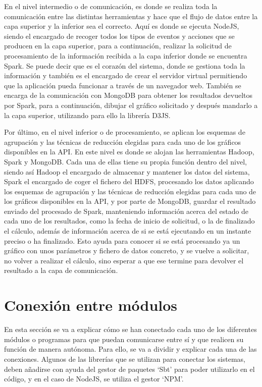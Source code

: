 En el nivel intermedio o de comunicación, es donde se realiza toda la comunicación entre las distintas herramientas y hace que el flujo de datos entre la capa superior y la inferior sea el correcto. Aquí es donde se ejecuta NodeJS, siendo el encargado de recoger todos los tipos de eventos y acciones que se producen en la capa superior, para a continuación, realizar la solicitud de procesamiento de la información recibida a la capa inferior donde se encuentra Spark. Se puede decir que es el corazón del sistema, donde se gestiona toda la información y también es el encargado de crear el servidor virtual permitiendo que la aplicación pueda funcionar a través de un navegador web. 
También se encarga de la comunicación con MongoDB para obtener los resultados devueltos por Spark, para a continuación, dibujar el gráfico solicitado y después mandarlo a la capa superior, utilizando para ello la librería D3JS. 

Por último, en el nivel inferior o de procesamiento, se aplican los esquemas de agrupación y las técnicas de reducción elegidas para cada uno de los gráficos disponibles en la API. En este nivel es donde se alojan las herramientas Hadoop, Spark y MongoDB. Cada una de ellas tiene su propia función dentro del nivel, siendo así Hadoop el encargado de almacenar y mantener los datos del sistema, Spark el encargado de coger el fichero del HDFS, procesando los datos aplicando los esquemas de agrupación y las técnicas de reducción elegidas para cada uno de los gráficos disponibles en la API, y por parte de MongoDB, guardar el resultado enviado del procesado de Spark, manteniendo información acerca del estado de cada uno de los resultados, como la fecha de inicio de solicitud, o la de finalizado el cálculo, además de información acerca de si se está ejecutando en un instante preciso o ha finalizado. Esto ayuda para conocer si se está procesando ya un gráfico con unos parámetros y fichero de datos concreto, y se vuelve a solicitar, no volver a realizar el cálculo, sino esperar a que ese termine para devolver el resultado a la capa de comunicación.

\section{Conexión entre módulos}
En esta sección se va a explicar cómo se han conectado cada uno de los diferentes módulos o programas para que puedan comunicarse entre sí y que realicen su función de manera autónoma. Para ello, se va a dividir y explicar cada una de las conexiones. Algunos de las librerías que se utilizan para conectar los sistemas, deben añadirse con ayuda del gestor de paquetes ‘Sbt’ para poder utilizarlo en el código, y en el caso de NodeJS, se utiliza el gestor ‘NPM’.

